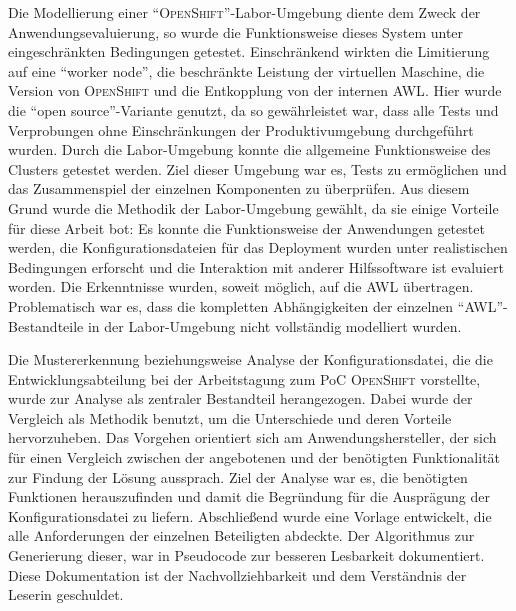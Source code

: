 Die Modellierung einer \enquote{\textsc{OpenShift}}-Labor-Umgebung diente dem Zweck der Anwendungsevaluierung, so wurde die Funktionsweise dieses System unter eingeschränkten Bedingungen getestet. Einschränkend wirkten die Limitierung auf eine \enquote{worker node}, die beschränkte Leistung der virtuellen Maschine, die Version von \textsc{OpenShift} und die Entkopplung von der internen \ac{AWL}. Hier wurde die \enquote{open source}-Variante genutzt, da so gewährleistet war, dass alle Tests und Verprobungen ohne Einschränkungen der Produktivumgebung durchgeführt wurden. Durch die Labor-Umgebung konnte die allgemeine Funktionsweise des Clusters getestet werden. Ziel dieser Umgebung war es, Tests zu ermöglichen und das Zusammenspiel der einzelnen Komponenten zu überprüfen. Aus diesem Grund wurde die Methodik der Labor-Umgebung gewählt, da sie einige Vorteile für diese Arbeit bot: Es konnte die Funktionsweise der Anwendungen getestet werden, die Konfigurationsdateien für das Deployment wurden unter realistischen Bedingungen erforscht und die Interaktion mit anderer Hilfssoftware ist evaluiert worden. Die Erkenntnisse wurden, soweit möglich, auf die \ac{AWL} übertragen. Problematisch war es, dass die kompletten Abhängigkeiten der einzelnen \enquote{\ac{AWL}}-Bestandteile in der Labor-Umgebung nicht vollständig modelliert wurden.
\par
Die Mustererkennung beziehungsweise Analyse der Konfigurationsdatei, die die Entwicklungsabteilung bei der Arbeitstagung zum \ac{PoC} \textsc{OpenShift} vorstellte, wurde zur Analyse als zentraler Bestandteil herangezogen. Dabei wurde der Vergleich als Methodik benutzt, um die Unterschiede und deren Vorteile hervorzuheben. Das Vorgehen orientiert sich am Anwendungshersteller, der sich für einen Vergleich zwischen der angebotenen und der benötigten Funktionalität zur Findung der Lösung aussprach.\autocite[vgl.][Application\,$\rightarrow$\,Deployments]{red_hat_inc_okd_2019} Ziel der Analyse war es, die benötigten Funktionen herauszufinden und damit die Begründung für die Ausprägung der Konfigurationsdatei zu liefern. Abschließend wurde eine Vorlage entwickelt, die alle Anforderungen der einzelnen Beteiligten abdeckte. Der Algorithmus zur Generierung dieser, war in Pseudocode zur besseren Lesbarkeit dokumentiert. Diese Dokumentation ist der Nachvollziehbarkeit und dem Verständnis der Leserin geschuldet.
\par
